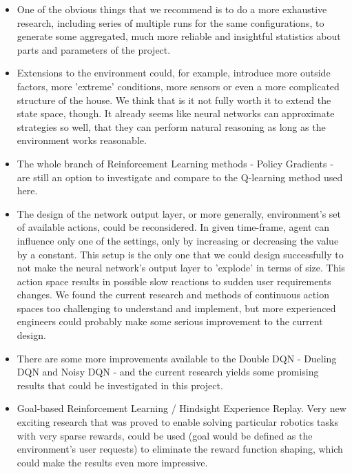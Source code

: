 \documentclass{article}
\begin{document}
\begin{itemize}
\item One of the obvious things that we recommend is to do a more exhaustive research, including series of multiple runs for the same configurations, to generate some aggregated, much more reliable and insightful statistics about parts and parameters of the project.

\item Extensions to the environment could, for example, introduce more outside factors, more 'extreme' conditions, more sensors or even a more complicated structure of the house. We think that is it not fully worth it to extend the state space, though. It already seems like neural networks can approximate strategies so well, that they can perform natural reasoning as long as the environment works reasonable.

\item The whole branch of Reinforcement Learning methods - Policy Gradients - are still an option to investigate and compare to the Q-learning method used here. 

\item The design of the network output layer, or more generally, environment's set of available actions, could be reconsidered. In given time-frame, agent can influence only one of the settings, only by increasing or decreasing the value by a constant. This setup is the only one that we could design successfully to not make the neural network's output layer to 'explode' in terms of size. This action space results in possible slow reactions to sudden user requirements changes. We found the current research and methods of continuous action spaces too challenging to understand and implement, but more experienced engineers could probably make some serious improvement to the current design.

\item There are some more improvements available to the Double DQN - Dueling DQN and Noisy DQN \cite{rainbow_paper} - and the current research yields some promising results that could be investigated in this project.

\item Goal-based Reinforcement Learning / Hindsight Experience Replay. Very new exciting research that was proved to enable solving particular robotics tasks with very sparse rewards, could be used (goal would be defined as the environment's user requests) to eliminate the reward function shaping, which could make the results even more impressive.


\end{itemize}
\end{document}
